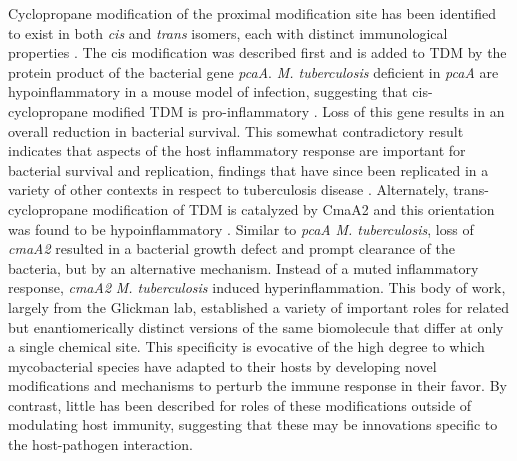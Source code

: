 Cyclopropane modification of the proximal modification site has been identified to exist in both \textit{cis} and \textit{trans} isomers, each with distinct immunological properties \citep{Glickman2000, Glickman2001, Rao2005, Rao2006}. The cis modification was described first and is added to TDM by the protein product of the bacterial gene \textit{pcaA}. \textit{M. tuberculosis} deficient in \textit{pcaA} are hypoinflammatory in a mouse model of infection, suggesting that cis-cyclopropane modified TDM is pro-inflammatory \citep{Rao2005}. Loss of this gene results in an overall reduction in bacterial survival. This somewhat contradictory result indicates that aspects of the host inflammatory response are important for bacterial survival and replication, findings that have since been replicated in a variety of other contexts in respect to tuberculosis disease \citep{Huynh2011, Sasindram2011, Tobin2012, Koul2004, Flynn2005}. Alternately, trans-cyclopropane modification of TDM is catalyzed by CmaA2 and this orientation was found to be hypoinflammatory \citep{Rao2006}. Similar to \textDelta \textit{pcaA} \textit{M. tuberculosis}, loss of \textit{cmaA2} resulted in a bacterial growth defect and prompt clearance of the bacteria, but by an alternative mechanism. Instead of a muted inflammatory response, \textDelta \textit{cmaA2} \textit{M. tuberculosis} induced hyperinflammation. This body of work, largely from the Glickman lab, established a variety of important roles for related but enantiomerically distinct versions of the same biomolecule that differ at only a single chemical site. This specificity is evocative of the high degree to which mycobacterial species have adapted to their hosts by developing novel modifications and mechanisms to perturb the immune response in their favor. By contrast, little has been described for roles of these modifications outside of modulating host immunity, suggesting that these may be innovations specific to the host-pathogen interaction.

